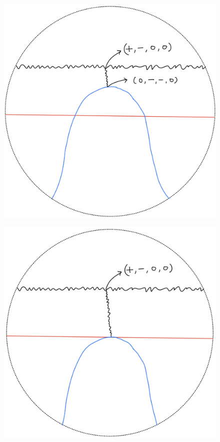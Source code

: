 \begin{definition}
\begin{enumerate}
\begin{itemize}
\begin{figure}[H]
    \caption{}
    \label{fig:your-label}
\end{figure}
\begin{figure}[H]
    \centering
    \includegraphics[scale = 0.45]{diagrams/lemma2/19.png} 
    \caption{}
    \label{fig:your-label}
\end{figure}
\begin{figure}[H]
    \centering
    \includegraphics[scale = 0.45]{diagrams/lemma2/20.png} 

\end{figure}
\end{itemize}
\end{enumerate}
\end{definition}
